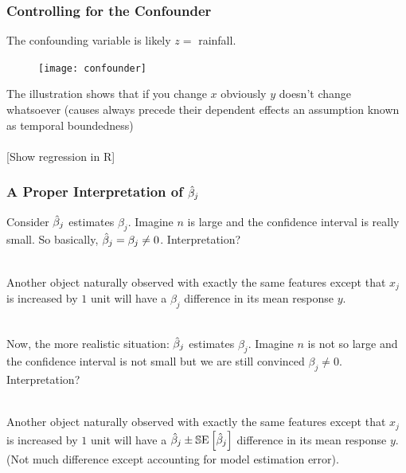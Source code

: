 \documentclass[slides]{beamer} %
\begin{document}
\begin{frame}\frametitle{Controlling for the Confounder}

The confounding variable is likely $z = $ rainfall.

\begin{figure}
\centering
\texttt{[image: confounder]}
\end{figure}

The illustration shows that if you change $x$ obviously $y$ doesn't change whatsoever (causes always precede their dependent effects an assumption known as temporal boundedness) \\~\\

[Show regression in R]

\end{frame}

\begin{frame}\frametitle{A Proper Interpretation of $\hat{\beta}_j$}

Consider $\hat{\beta}_j$ estimates $\beta_j$. Imagine $n$ is large and the confidence interval is really small. So basically, $\hat{\beta}_j = \beta_j \neq 0$. Interpretation? \\~\\ \pause

Another object naturally observed with exactly the same features except that $x_j$ is increased by $1$ unit will have a $\beta_j$ difference in its mean response $y$.\\~\\ \pause

Now, the more realistic situation: $\hat{\beta}_j$ estimates $\beta_j$. Imagine $n$ is not so large and the confidence interval is not small but we are still convinced $\beta_j \neq 0$.  Interpretation? \\~\\ \pause

Another object naturally observed with exactly the same features except that $x_j$ is increased by $1$ unit will have a \pause $\hat{\beta}_j \pm \mathbb{S}\text{E}\left[\hat{\beta}_j\right]$ difference in its mean response $y$. (Not much difference except accounting for model estimation error).\\~\\

\end{frame}
\end{document}
